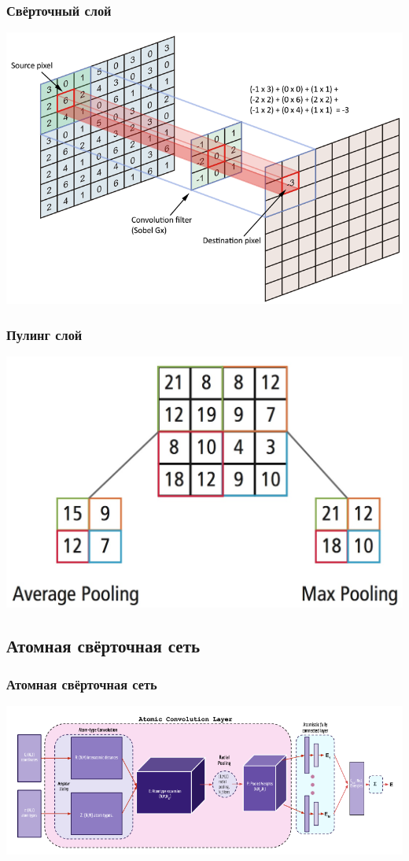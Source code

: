 \documentclass{beamer}
\begin{document}
\begin{frame}
\frametitle{Свёрточный слой}\begin{center}
\includegraphics[scale=0.3]{convolutional_layer.png}
\end{center}
\end{frame}

\begin{frame}
\frametitle{Пулинг слой}\begin{center}
\includegraphics[scale=0.3]{pooling.jpg}
\end{center}
\end{frame}


\subsection{Атомная свёрточная сеть}
\begin{frame}
\frametitle{Атомная свёрточная сеть}\begin{center}
\includegraphics[scale=0.4]{atomic_convolution_nn.png}
\end{center}
\end{frame}
\end{document}
